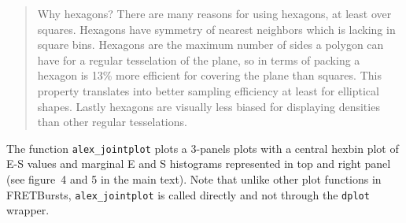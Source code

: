 \begin{quote}
Why hexagons? There are many reasons for using hexagons, at least over squares. 
Hexagons have symmetry of nearest neighbors which is lacking in square bins. 
Hexagons are the maximum number of sides a polygon can have for a regular 
tesselation of the plane, so in terms of packing a hexagon is 13\% more 
efficient for covering the plane than squares. This property translates into 
better sampling efficiency at least for elliptical shapes. Lastly hexagons are 
visually less biased for displaying densities than other regular tesselations. 
\end{quote}

The function \verb|alex_jointplot| plots a 3-panels plots with a central
hexbin plot of E-S values and marginal E and S histograms represented in
top and right panel (see figure~4 and 5 in the main text). Note that
unlike other plot functions in FRETBursts, \verb|alex_jointplot| 
is called directly and not through the \verb|dplot| wrapper.